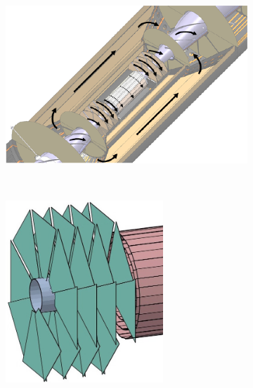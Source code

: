 \begin{figure}[htbp]
  \begin{subfigure}[b]{0.33\textwidth}
    \centering
    \includegraphics[width=\textwidth]{figures/CLIC/Cooling.png}  
    \caption{}
    \label{fig:cooling}
  \end{subfigure}~
  \begin{subfigure}[b]{0.33\textwidth}
    \centering
    \includegraphics[width=0.65\textwidth]{figures/CLIC/single_spiral.jpg}
    \caption{}
    \label{fig:SpiralsGeometry}
  \end{subfigure}~
  \begin{subfigure}[b]{0.25\textwidth}
    \centering

\end{subfigure}
\end{figure}
